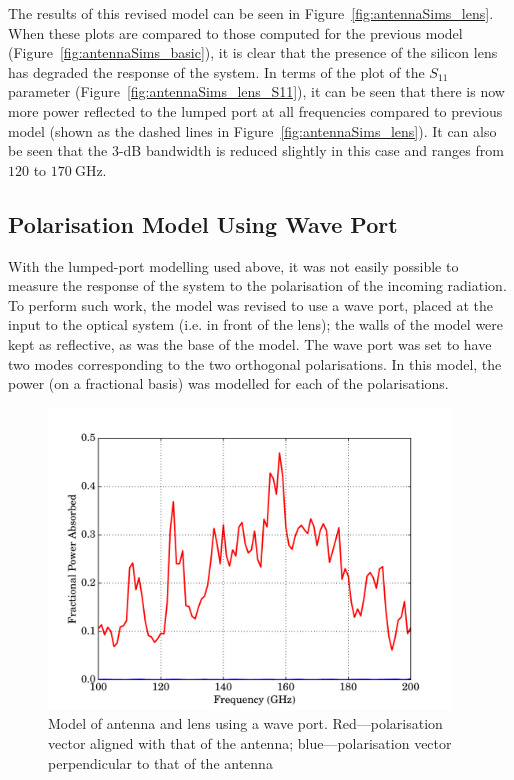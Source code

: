 \par 
The results of this revised model can be seen in Figure~\ref{fig:antennaSims_lens}. When these plots are compared to those computed for the previous model (Figure~\ref{fig:antennaSims_basic}), it is clear that the presence of the silicon lens has degraded the response of the system. In terms of the plot of the $S_{11}$ parameter (Figure~\ref{fig:antennaSims_lens_S11}), it can be seen that there is now more power reflected to the lumped port at all frequencies compared to previous model (shown as the dashed lines in Figure~\ref{fig:antennaSims_lens}). It can also be seen that the 3-dB bandwidth is reduced slightly in this case and ranges from $120$ to $170~\mathrm{GHz}$.
%
\subsection{Polarisation Model Using Wave Port}\label{ssec:antennaSims_LensForw}
With the lumped-port modelling used above, it was not easily possible to measure the response of the system to the polarisation of the incoming radiation. To perform such work, the model was revised to use a wave port, placed at the input to the optical system (i.e. in front of the lens); the walls of the model were kept as reflective, as was the base of the model. The wave port was set to have two modes corresponding to the two orthogonal polarisations. In this model, the power (on a fractional basis) was modelled for each of the polarisations.
\begin{figure}[tb]
\begin{center}
\includegraphics[width = 0.95\textwidth]{figures/antennaSim_lensForw}
\caption[Model of antenna and lens using a wave port]{Model of antenna and lens using a wave port. Red---polarisation vector aligned with that of the antenna; blue---polarisation vector perpendicular to that of the antenna}
\label{fig:antennaSims_lensForw}
\end{center}
\end{figure}
